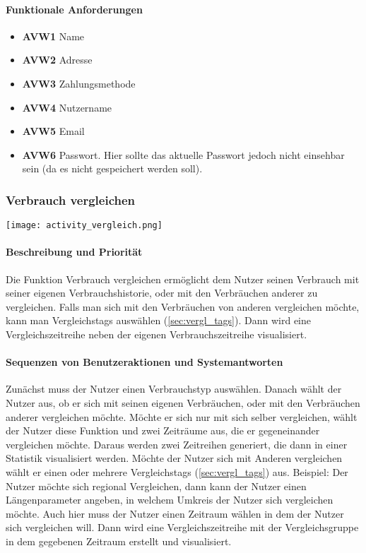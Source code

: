\paragraph{Funktionale Anforderungen}
\begin{itemize}
	\item \textbf{AVW1} Name
	\item \textbf{AVW2} Adresse
	\item \textbf{AVW3} Zahlungsmethode
	\item \textbf{AVW4} Nutzername
	\item \textbf{AVW5} Email
	\item \textbf{AVW6} Passwort. Hier sollte das aktuelle Passwort jedoch nicht einsehbar sein (da es nicht gespeichert werden soll).
\end{itemize}

\subsubsection{Verbrauch vergleichen}
\texttt{[image: activity\_vergleich.png]}
\paragraph{Beschreibung und Priorität}
Die Funktion Verbrauch vergleichen ermöglicht dem Nutzer seinen Verbrauch mit seiner eigenen Verbrauchshistorie, oder mit den Verbräuchen anderer zu vergleichen. Falls man sich mit den Verbräuchen von anderen vergleichen möchte, kann man Vergleichstags auswählen (\ref{sec:vergl_tags}). Dann wird eine Vergleichszeitreihe neben der eigenen Verbrauchszeitreihe visualisiert.
\paragraph{Sequenzen von Benutzeraktionen und Systemantworten}
Zunächst muss der Nutzer einen Verbrauchstyp auswählen. Danach wählt der Nutzer aus, ob er sich mit seinen eigenen Verbräuchen, oder mit den Verbräuchen anderer vergleichen möchte. Möchte er sich nur mit sich selber vergleichen, wählt der Nutzer diese Funktion und zwei Zeiträume aus, die er gegeneinander vergleichen möchte. Daraus werden zwei Zeitreihen generiert, die dann in einer Statistik visualisiert werden. Möchte der Nutzer sich mit Anderen vergleichen wählt er einen oder mehrere Vergleichstags (\ref{sec:vergl_tags}) aus. Beispiel: Der Nutzer möchte sich regional Vergleichen, dann kann der Nutzer einen Längenparameter angeben, in welchem Umkreis der Nutzer sich vergleichen möchte. Auch hier muss der Nutzer einen Zeitraum wählen in dem der Nutzer sich vergleichen will. Dann wird eine Vergleichszeitreihe mit der Vergleichsgruppe in dem gegebenen Zeitraum erstellt und visualisiert. 
